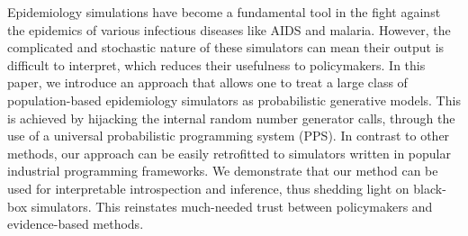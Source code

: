 Epidemiology simulations have become a fundamental tool in the fight
against the epidemics of various infectious diseases like AIDS and
malaria. However, the complicated and stochastic nature of these simulators
can mean their output is difficult to interpret, which reduces their usefulness to policymakers. In this paper, we introduce an approach that allows one to treat a large class of population-based epidemiology simulators as probabilistic generative models. This is achieved by hijacking the internal random number generator calls, through the use of a universal probabilistic programming system (PPS). In contrast to other methods, our approach can be easily retrofitted to simulators written in popular industrial programming frameworks. 
We demonstrate that our method can be used for interpretable introspection and inference, thus shedding light on black-box simulators. This reinstates much-needed trust between policymakers and evidence-based methods.
